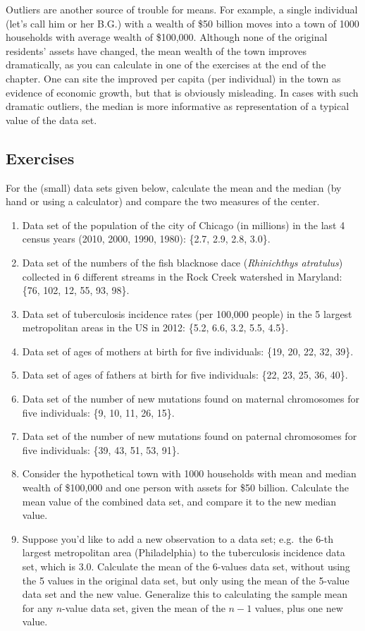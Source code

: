 \documentclass[
  letterpaper,
  DIV=11,
  numbers=noendperiod]{scrreprt}
\begin{document}
Outliers are another source of trouble for means. For example, a single
individual (let's call him or her B.G.) with a wealth of \$50 billion
moves into a town of 1000 households with average wealth of \$100,000.
Although none of the original residents' assets have changed, the mean
wealth of the town improves dramatically, as you can calculate in one of
the exercises at the end of the chapter. One can site the improved per
capita (per individual) in the town as evidence of economic growth, but
that is obviously misleading. In cases with such dramatic outliers, the
median is more informative as representation of a typical value of the
data set.

\hypertarget{exercises-6}{%
\subsection{Exercises}\label{exercises-6}}

For the (small) data sets given below, calculate the mean and the median
(by hand or using a calculator) and compare the two measures of the
center.

\begin{enumerate}
\def\labelenumi{\arabic{enumi}.}
\item
  Data set of the population of the city of Chicago (in millions) in the
  last 4 census years (2010, 2000, 1990, 1980): \{2.7, 2.9, 2.8, 3.0\}.
\item
  Data set of the numbers of the fish blacknose dace (\emph{Rhinichthys
  atratulus}) collected in 6 different streams in the Rock Creek
  watershed in Maryland: \{76, 102, 12, 55, 93, 98\}.
\item
  Data set of tuberculosis incidence rates (per 100,000 people) in the 5
  largest metropolitan areas in the US in 2012: \{5.2, 6.6, 3.2, 5.5,
  4.5\}.
\item
  Data set of ages of mothers at birth for five individuals: \{19, 20,
  22, 32, 39\}.
\item
  Data set of ages of fathers at birth for five individuals: \{22, 23,
  25, 36, 40\}.
\item
  Data set of the number of new mutations found on maternal chromosomes
  for five individuals: \{9, 10, 11, 26, 15\}.
\item
  Data set of the number of new mutations found on paternal chromosomes
  for five individuals: \{39, 43, 51, 53, 91\}.
\item
  Consider the hypothetical town with 1000 households with mean and
  median wealth of \$100,000 and one person with assets for \$50
  billion. Calculate the mean value of the combined data set, and
  compare it to the new median value.
\item
  Suppose you'd like to add a new observation to a data set; e.g.~the
  6-th largest metropolitan area (Philadelphia) to the tuberculosis
  incidence data set, which is 3.0. Calculate the mean of the 6-values
  data set, without using the 5 values in the original data set, but
  only using the mean of the 5-value data set and the new value.
  Generalize this to calculating the sample mean for any \(n\)-value
  data set, given the mean of the \(n-1\) values, plus one new value.
\end{enumerate}
\end{document}
